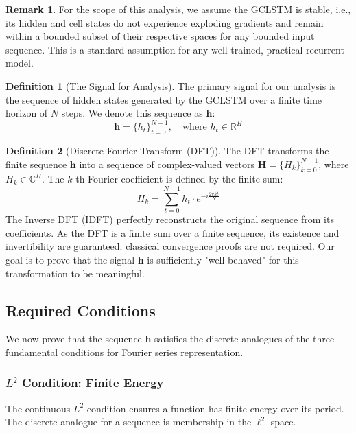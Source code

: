\documentclass{article}
\theoremstyle{remark}
\theoremstyle{definition}
\newtheorem{definition}{Definition}
\newtheorem{remark}[theorem]{Remark}
\begin{document}
\begin{remark}
For the scope of this analysis, we assume the GCLSTM is stable, i.e., its hidden and cell states do not experience exploding gradients and remain within a bounded subset of their respective spaces for any bounded input sequence. This is a standard assumption for any well-trained, practical recurrent model.
\end{remark}

\begin{definition}[The Signal for Analysis]
The primary signal for our analysis is the sequence of hidden states generated by the GCLSTM over a finite time horizon of $N$ steps. We denote this sequence as $\mathbf{h}$:
\begin{equation}
    \mathbf{h} = \{h_t\}_{t=0}^{N-1}, \quad \text{where } h_t \in \mathbb{R}^H
\end{equation}
\end{definition}

\begin{definition}[Discrete Fourier Transform (DFT)]
The DFT transforms the finite sequence $\mathbf{h}$ into a sequence of complex-valued vectors $\mathbf{H} = \{H_k\}_{k=0}^{N-1}$, where $H_k \in \mathbb{C}^H$. The $k$-th Fourier coefficient is defined by the finite sum:
\begin{equation}
    H_k = \sum_{t=0}^{N-1} h_t \cdot e^{-i \frac{2\pi k t}{N}}
\end{equation}
The Inverse DFT (IDFT) perfectly reconstructs the original sequence from its coefficients. As the DFT is a finite sum over a finite sequence, its existence and invertibility are guaranteed; classical convergence proofs are not required. Our goal is to prove that the signal $\mathbf{h}$ is sufficiently "well-behaved" for this transformation to be meaningful.
\end{definition}

\subsection{Required Conditions}

We now prove that the sequence $\mathbf{h}$ satisfies the discrete analogues of the three fundamental conditions for Fourier series representation.

\subsubsection{$L^2$ Condition: Finite Energy}
The continuous $L^2$ condition ensures a function has finite energy over its period. The discrete analogue for a sequence is membership in the $\ell^2$ space.
\end{document}
